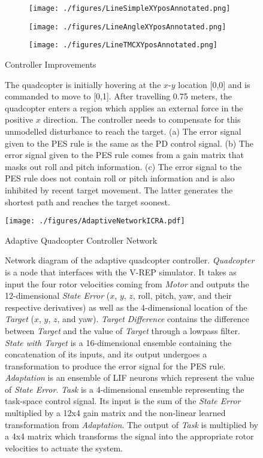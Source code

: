 \documentclass[letterpaper, 10 pt, conference]{ieeeconf}  %
\begin{document}
\begin{figure}
\centering
\begin{subfigure}[t]{0.15\textwidth}
\texttt{[image: ./figures/LineSimpleXYposAnnotated.png]}
\caption{}
\label{fig:ImprovementComparisonA}
\end{subfigure}
\begin{subfigure}[t]{0.15\textwidth}
\texttt{[image: ./figures/LineAngleXYposAnnotated.png]}
\caption{}
\label{fig:ImprovementComparisonB}
\end{subfigure}
\begin{subfigure}[t]{0.15\textwidth}
\texttt{[image: ./figures/LineTMCXYposAnnotated.png]}
\caption{}
\label{fig:ImprovementComparisonC}
\end{subfigure}
\caption{Controller Improvements}
\label{fig:ImprovementComparison}
\captionsetup{singlelinecheck=off,font=footnotesize}
\caption*{The quadcopter is initially hovering at the $x$-$y$ location [0,0] and is commanded to move to [0,1]. After travelling 0.75 meters, the quadcopter enters a region which applies an external force in the positive $x$ direction. The controller needs to compensate for this unmodelled disturbance to reach the target. (a) The error signal given to the PES rule is the same as the PD control signal. (b) The error signal given to the PES rule comes from a gain matrix that masks out roll and pitch information. (c) The error signal to the PES rule does not contain roll or pitch information and is also inhibited by recent target movement. The latter generates the shortest path and reaches the target soonest.}
\end{figure}

\begin{figure}
\centering
\texttt{[image: ./figures/AdaptiveNetworkICRA.pdf]}
\caption{Adaptive Quadcopter Controller Network}
\label{fig:NetFinal}
\captionsetup{singlelinecheck=off,font=footnotesize}
\caption*{Network diagram of the adaptive quadcopter controller. \textit{Quadcopter} is a node that interfaces with the V-REP simulator. It takes as input the four rotor velocities coming from \textit{Motor} and outputs the 12-dimensional \textit{State Error} ($x$, $y$, $z$, roll, pitch, yaw, and their respective derivatives) as well as the 4-dimensional location of the \textit{Target} ($x$, $y$, $z$, and yaw). \textit{Target Difference} contains the difference between \textit{Target} and the value of \textit{Target} through a lowpass filter. \textit{State with Target} is a 16-dimensional ensemble containing the concatenation of its inputs, and its output undergoes a transformation to produce the error signal for the PES rule. \textit{Adaptation} is an ensemble of LIF neurons which represent the value of \textit{State Error}. \textit{Task} is a 4-dimensional ensemble representing the task-space control signal. Its input is the sum of the \textit{State Error} multiplied by a 12x4 gain matrix and the non-linear learned transformation from \textit{Adaptation}. The output of \textit{Task} is multiplied by a 4x4 matrix which transforms the signal into the appropriate rotor velocities to actuate the system.}
\end{figure}
\end{document}

